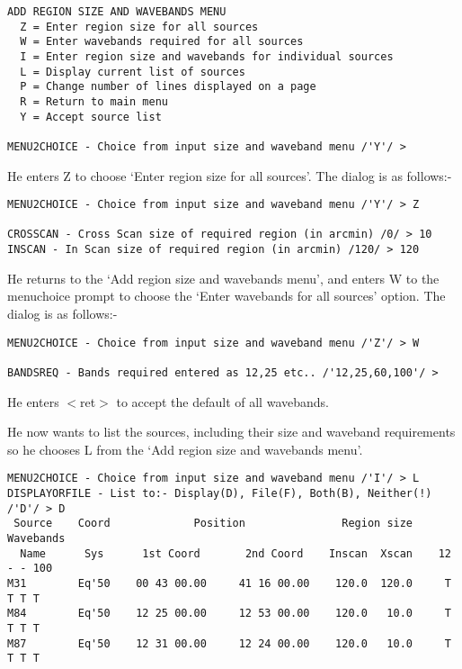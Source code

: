 \documentclass[twoside,11pt]{article}
\begin{document}
\begin{verbatim}
ADD REGION SIZE AND WAVEBANDS MENU
  Z = Enter region size for all sources
  W = Enter wavebands required for all sources
  I = Enter region size and wavebands for individual sources
  L = Display current list of sources
  P = Change number of lines displayed on a page
  R = Return to main menu
  Y = Accept source list

MENU2CHOICE - Choice from input size and waveband menu /'Y'/ > 
\end{verbatim}

He enters Z to choose `Enter region size for all sources'. The dialog is as
follows:-

\begin{verbatim}
MENU2CHOICE - Choice from input size and waveband menu /'Y'/ > Z

CROSSCAN - Cross Scan size of required region (in arcmin) /0/ > 10
INSCAN - In Scan size of required region (in arcmin) /120/ > 120
\end{verbatim}

He returns to the `Add region size and wavebands menu', and enters W to the
menuchoice prompt to choose the `Enter wavebands for all sources' option. The
dialog is as follows:-

\begin{verbatim}
MENU2CHOICE - Choice from input size and waveband menu /'Z'/ > W

BANDSREQ - Bands required entered as 12,25 etc.. /'12,25,60,100'/ >
\end{verbatim}

He enters $<$ret$>$ to accept the default of all wavebands.

He now wants to list the sources, including their size and waveband requirements
so he chooses L from the `Add region size and wavebands menu'.

\begin{verbatim}
MENU2CHOICE - Choice from input size and waveband menu /'I'/ > L
DISPLAYORFILE - List to:- Display(D), File(F), Both(B), Neither(!) /'D'/ > D
 Source    Coord             Position               Region size     Wavebands
  Name      Sys      1st Coord       2nd Coord    Inscan  Xscan    12 - - 100
M31        Eq'50    00 43 00.00     41 16 00.00    120.0  120.0     T T T T
M84        Eq'50    12 25 00.00     12 53 00.00    120.0   10.0     T T T T
M87        Eq'50    12 31 00.00     12 24 00.00    120.0   10.0     T T T T
\end{verbatim}
\end{document}
